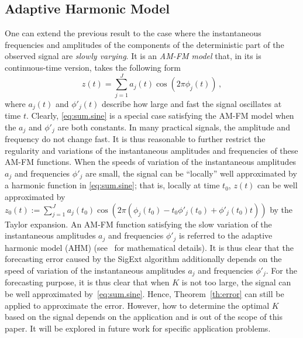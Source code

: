 \subsection{Adaptive Harmonic Model}\label{RemarkAHM}

One can extend the previous result to the case where the instantaneous frequencies and amplitudes of the components of the deterministic part of the observed signal are {\em slowly varying}. It is an \textit{AM-FM model} that, in its is continuous-time version, takes the following form
\begin{equation}
z(t) = \sum_{j=1}^J a_j(t)\cos(2\pi\phi_j(t))\,,
\end{equation}
where $a_j(t)$ and $\phi'_j(t)$ describe how large and fast the signal oscillates at time $t$. 
Clearly, \eqref{eq:sum.sine} is a special case satisfying the AM-FM model when the $a_j$ and $\phi'_j$ are both constants. 
%
In many practical signals, the amplitude and frequency do not change fast. It is thus reasonable to further restrict the regularity and variations of the instantaneous amplitudes and frequencies of these AM-FM functions. When the speeds of variation of the instantaneous amplitudes $a_j$ and frequencies $\phi'_j$ are small, the signal can be ``locally'' well approximated by a harmonic function in \eqref{eq:sum.sine}; that is, 
%
locally at time $t_0$, $z(t)$ can be well approximated by $z_0(t) := \sum_{j=1}^J a_j(t_0)\cos(2\pi(\phi_j(t_0)-t_0\phi'_j(t_0)+\phi'_j(t_0)t))$ by the Taylor expansion. An AM-FM function satisfying the slow variation of the instantaneous amplitudes $a_j$ and frequencies $\phi'_j$ is referred to the adaptive harmonic model (AHM) (see~\cite{Chen14nonparametric,Daubechies16conceft} for mathematical details).
It is thus clear that the forecasting error caused by the {\sf SigExt} algorithm additionally depends on the speed of variation of the instantaneous amplitudes $a_j$ and frequencies $\phi'_j$. 
%
For the forecasting purpose, it is thus clear that when $K$ is not too large, the signal can be well approximated by~\eqref{eq:sum.sine}. Hence, Theorem~\ref{th:error} can still be applied to approximate the error. However, how to determine the optimal $K$ based on the signal depends on the application and is out of the scope of this paper. It will be explored in future work for specific application problems.


